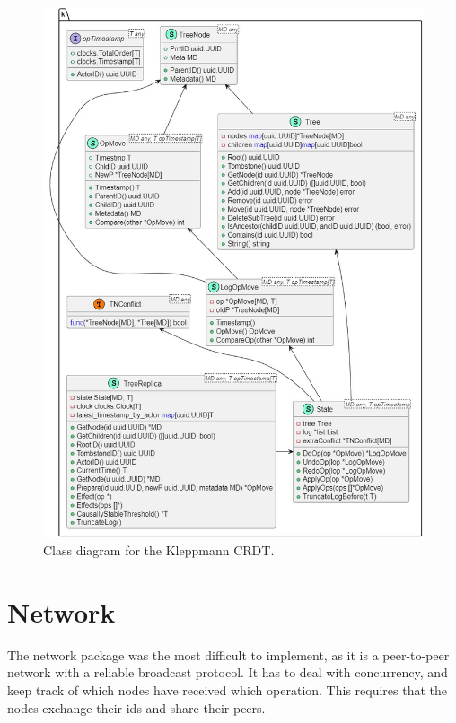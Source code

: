 \documentclass[12pt]{report}
\begin{document}
\begin{figure}[H]
    \centering
    \includegraphics[width=13cm]{images/kcrdt_impl.jpg} 
    \caption{Class diagram for the Kleppmann CRDT.}
    \label{fig:kcrdt} 
\end{figure} 



\section{Network}
The network package was the most difficult to implement, as it is a peer-to-peer network with a reliable broadcast protocol. It has to deal with concurrency, and keep track of which nodes have received which operation. This requires that the nodes exchange their ids and share their peers. \par
\end{document}
